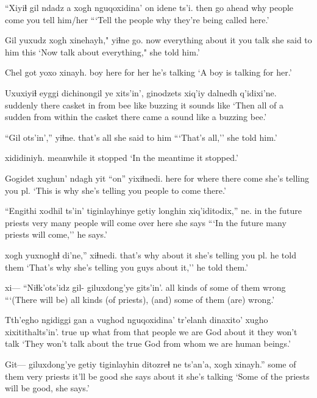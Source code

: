 \documentclass[12pt]{article}
\begin{document}
\gll ``Xiyiɬ gil {ndadz a xogh}  nguqoxidina' on   {idene ts'i.}
then {go ahead} why           people       come {you tell him/her} {}  
\glt ```Tell the people why they're being called here.'
\glend

\gll Gil yuxudz xogh xinehayh,"  yiɬne           go.
now everything {about it} {you talk} {she said to him} this 
\glt `Now talk about everything," she told him.'
\glend

\gll Chel got   yoxo    xinayh.
boy  here {for her} {he's talking}
\glt `A boy is talking for her.'
\glend

\gll Uxuxiyiɬ   eyggi dichinongil ye xits'in', ginodzets xiq'iy dalnedh q'idixi'ne.
suddenly there   casket      in from      bee       like   buzzing {it sounds like}
\glt `Then all of a sudden from within the casket there came a sound like a buzzing bee.'
\glend

\gll ``{Gil  ots'in',}''    yiɬne.
{that's all} {she said to him}
\glt ```That's all,'' she told him.'
\glend

 xididiniyh.
meanwhile    {it stopped}
\glt `In the meantime it stopped.'
\glend

\gll Gogidet xughun' ndagh yit ``on''   yixiɬnedi.
here    for     where   there   come {she's telling you pl.}
\glt `This is why she's telling you people to come there.' 
\glend

\gll ``{Engithi xodhil ts'in'}    tiginlayhinye getiy longhin xiq'iditodix,'' ne.     
{in the future} priests        very  {many people} {will come over here} {she says} 
\glt ```In the future many priests will come,'' he says.'
\glend

 xogh  {yuxnoghɬ di'ne,}'' xiɬnedi. 
{that's why}  {about it} {she's telling you pl.} {he told them} 
\glt `That's why she's telling you guys about it,'' he told them.'
\glend

\gll xi--- ``Niɬk'ots'idz      gil- giluxdong'ye  gits'in'. 
{} {all kinds of} {}  {some of them}  wrong   
\glt ```(There will be) all kinds (of priests), (and) some of them (are) wrong.'                    
\glend
                                           
\gll Tth'egho ngidiggi gan a vughod    nguqoxidina' tr'elanh dinaxito' xugho xixitithalts'in'.
true     up      what {} {from that} people   {we are}  God   {about it}  {they won't talk }
\glt `They won't talk about the true God from whom we are human beings.'
\glend

\gll Git--- giluxdong'ye getiy tiginlayhin ditozreɬ      ne {ts'an'a}, xogh xinayh.''
{}   {some of them} very  priests    {it'll be good} {she says} {} {about it} {she's talking} 
\glt `Some of the priests will be good, she says.'
\glend
\end{document}

